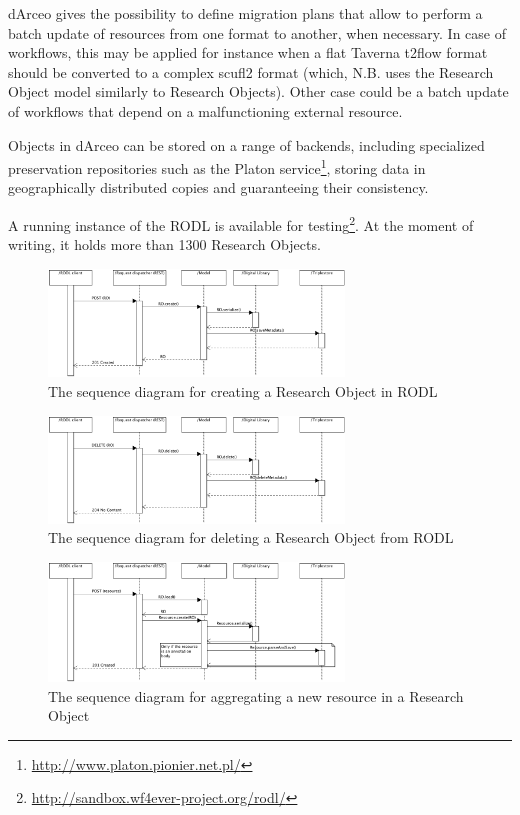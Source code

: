 dArceo gives the possibility to define migration plans that allow to perform a batch update of resources from one format to another, when necessary. In case of workflows, this may be applied for instance when a flat Taverna t2flow format should be converted to a complex scufl2 format (which, N.B. uses the Research Object model similarly to Research Objects). Other case could be a batch update of workflows that depend on a malfunctioning external resource.

Objects in dArceo can be stored on a range of backends, including specialized preservation repositories such as the Platon service\footnote{\url{http://www.platon.pionier.net.pl/}}, storing data in geographically distributed copies and guaranteeing their consistency.

A running instance of the RODL is available for testing\footnote{\url{http://sandbox.wf4ever-project.org/rodl/}}. At the moment of writing, it holds more than 1300 Research Objects.


\begin{figure}[!h]
\centering
\includegraphics[width=0.7\textwidth]{Figures/RODL/ROcreate.png}
\caption{The sequence diagram for creating a Research Object in RODL}
\label{ROCreate}
\end{figure}

\begin{figure}[!h]
\centering
\includegraphics[width=0.7\textwidth]{Figures/RODL/ROdelete.png}
\caption{The sequence diagram for deleting a Research Object from RODL}
\label{RODelete}
\end{figure}

\begin{figure}[!h]
\centering
\includegraphics[width=0.7\textwidth]{Figures/RODL/ResourceAdd.png}
\caption{The sequence diagram for aggregating a new resource in a Research Object}
\label{ResourceAdd}
\end{figure}

